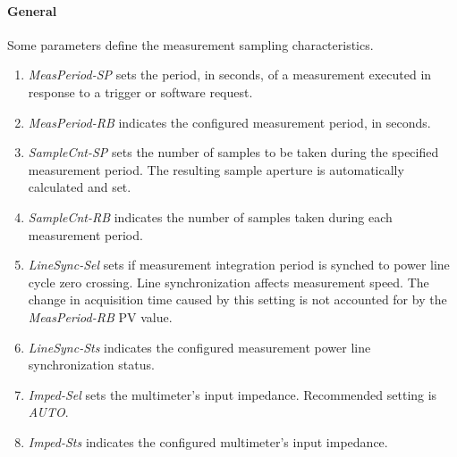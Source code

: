 \documentclass[openany]{article}
\begin{document}
	\bigskip
	\noindent{}

		\paragraph{General} Some parameters define the measurement sampling characteristics.

			\noindent{}

			\begin{enumerate}
				\item \emph{MeasPeriod-SP} sets the period, in seconds, of a measurement executed in response to a trigger or software request.
				\item \emph{MeasPeriod-RB} indicates the configured measurement period, in seconds.
				\item \emph{SampleCnt-SP} sets the number of samples to be taken during the specified measurement period. The resulting sample aperture is automatically calculated and set.
				\item \emph{SampleCnt-RB} indicates the number of samples taken during each measurement period.
				\item \emph{LineSync-Sel} sets if measurement integration period is synched to power line cycle zero crossing. Line synchronization affects measurement speed. The change in acquisition time caused by this setting is not accounted for by the \emph{MeasPeriod-RB} PV value.
				\item \emph{LineSync-Sts} indicates the configured measurement power line synchronization status.
				\item \emph{Imped-Sel} sets the multimeter's input impedance. Recommended setting is \emph{AUTO}.
				\item \emph{Imped-Sts} indicates the configured multimeter's input impedance.
			\end{enumerate}

			\noindent{}
\end{document}
